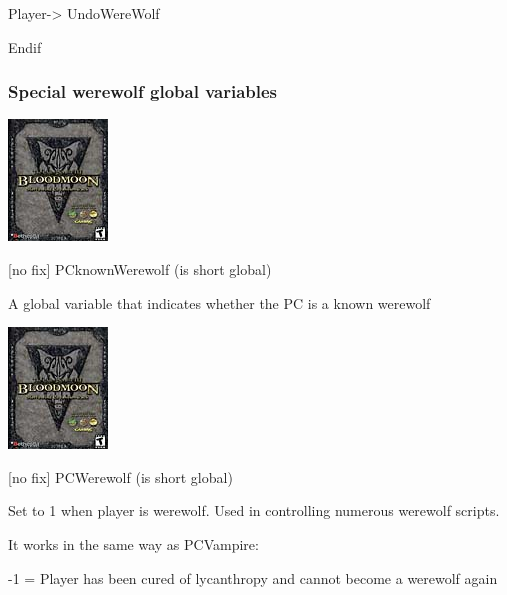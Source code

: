 Player-> UndoWereWolf

Endif

%
%

\hypertarget{special-werewolf-global-variables}{%
\subsubsection{Special werewolf global
variables}\label{special-werewolf-global-variables}}

\includegraphics{media/image7.png}

{[}no fix{]} PCknownWerewolf (is short global)

A global variable that indicates whether the PC is a known werewolf

\includegraphics{media/image7.png}

{[}no fix{]} PCWerewolf (is short global)

Set to 1 when player is werewolf. Used in controlling numerous werewolf
scripts.

It works in the same way as PCVampire:

-1 = Player has been cured of lycanthropy and cannot become a werewolf
again

